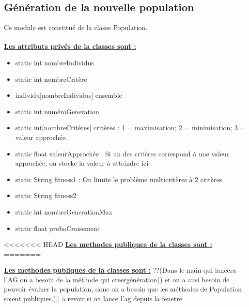 \documentclass[a4paper,11pt]{article}
\begin{document}
		\subsection{Génération de la nouvelle population}
			Ce module est constitué de la classe Population.\\
			\\
			\underline{\bf Les attributs privés de la classes sont :}\\
				\begin{itemize}
				\item static int nombreIndividus
				\item static int nombreCritère
				\item individu[nombreIndividus] ensemble
				\item static int numéroGeneration
				\item static int[nombreCritères] critères : 1  = maximisation; 2 = minimisation; 3 = valeur approchée.
				\item static float valeurApprochée : Si un des critères correspond à une valeur approchée, on stocke la valeur à atteindre ici
				\item static String fitness1 : On limite le problème multicritères à 2 critères
				\item static String fitness2
				\item static int nombreGenerationMax
				\item static float probaCroisement\\
			\end{itemize}
<<<<<<< HEAD
			\underline{\bf Les methodes publiques de la classes sont :} %
=======

			\underline{\bf Les methodes publiques de la classes sont :} ??(Dans le main qui lancera l’AG on a besoin de la méthode qui creergénération() et on a ausi besoin de pouvoir évaluer la population, donc on a besoin que les méthodes de Population soient publiques.)|| a revoir si on lance l'ag depuis la fenetre\\\\
\end{document}
